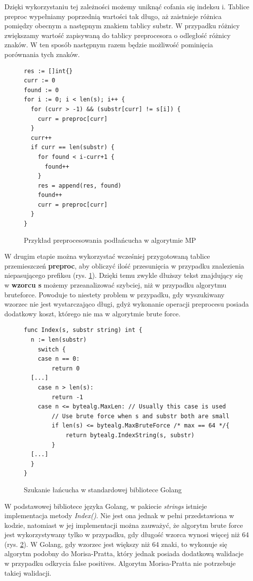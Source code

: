 Dzięki wykorzystaniu tej zależności możemy uniknąć cofania się indeksu i. 
Tablice preproc wypełniamy poprzednią wartości tak długo, aż zaistnieje różnica 
pomiędzy obecnym a następnym znakiem tablicy substr. W przypadku różnicy 
zwiększamy wartość zapisywaną do tablicy preprocesora o odległość różnicy znaków.
W ten sposób następnym razem będzie możliwość pominięcia porównania tych znaków.

\begin{figure}[h]
  \centering
  \begin{lstlisting}
res := []int{}
curr := 0
found := 0
for i := 0; i < len(s); i++ {
  for (curr > -1) && (substr[curr] != s[i]) {
    curr = preproc[curr]
  }
  curr++
  if curr == len(substr) {
    for found < i-curr+1 {
      found++
    }
    res = append(res, found)
    found++
    curr = preproc[curr]
  }
}
  \end{lstlisting}
  \caption{Przykład preprocesowania podłańcucha w algorytmie MP}
  \label{fig:code:algoMorisPratt}
\end{figure}

W drugim etapie można wykorzystać wcześniej przygotowaną tablice przemieszczeń 
\textbf{preproc}, aby obliczyć ilość przesunięcia w przypadku znalezienia 
niepasującego prefiksu (rys. \ref{fig:code:algoMorisPratt}). Dzięki temu zwykle dłuższy tekst znajdujący się w 
\textbf{wzorcu s} możemy przeanalizować szybciej, niż w przypadku algorytmu 
bruteforce. Powoduje to niestety problem w przypadku, gdy wyszukiwany wzorzec
nie jest wystarczająco długi, gdyż wykonanie operacji preprocesu posiada 
dodatkowy koszt, którego nie ma w algorytmie brute force.

\begin{figure}[h]
  \centering
  \begin{lstlisting}
func Index(s, substr string) int {
  n := len(substr)
	switch {
	case n == 0:
		return 0
  [...]
	case n > len(s):
		return -1
	case n <= bytealg.MaxLen: // Usually this case is used
		// Use brute force when s and substr both are small
		if len(s) <= bytealg.MaxBruteForce /* max == 64 */{
			return bytealg.IndexString(s, substr)
		}
  [...]
  }
}
  \end{lstlisting}
  \caption{Szukanie łańcucha w standardowej bibliotece Golang}
  \label{fig:code:golangSearchInsideString}
\end{figure}

W podstawowej bibliotece języka Golang, w pakiecie \textit{strings} istnieje 
implementacja metody \textit{Index()}. Nie jest ona jednak w pełni przedstawiona
w kodzie, natomiast w jej implementacji można zauważyć, że algorytm brute force
jest wykorzystywany tylko w przypadku, gdy długość wzorca wynosi więcej niż 64 
(rys. \ref{fig:code:golangSearchInsideString}). W Golang, gdy wzorzec jest większy niż
64 znaki, to wykonuje się algorytm podobny do Morisa-Pratta, który jednak 
posiada dodatkową walidacje w przypadku odkrycia false positives. 
Algorytm Morisa-Pratta nie potrzebuje takiej walidacji.


